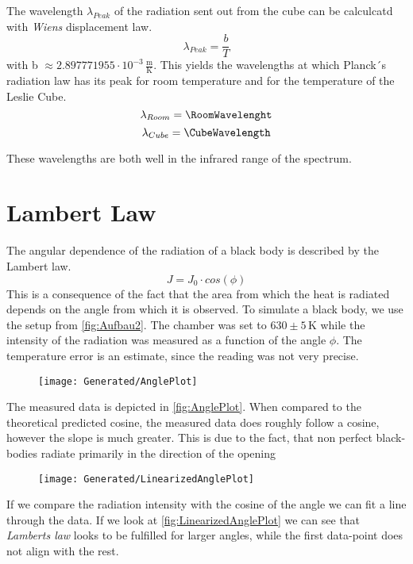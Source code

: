 \documentclass[a4paper,10pt,twocolumn]{article}
\begin{document}
    The wavelength $\lambda_{Peak}$ of the radiation sent out from the cube can be calculcatd with \textit{Wiens} displacement law.
    \begin{equation}
        \lambda_{Peak} = \frac{b}{T}
    \end{equation}
    with b $\approx 2.897771955\cdot 10^{-3}\,\frac{\text{m}}{\text{K}}$.
    This yields the wavelengths at which Planck´s radiation law has its peak for room temperature and for the temperature of the Leslie Cube.
    \begin{equation}
        \lambda_{Room} = \RoomWavelenght
    \end{equation}
    \begin{equation}
        \lambda_{Cube} = \CubeWavelength
    \end{equation}
    
    These wavelengths are both well in the infrared range of the spectrum.
    
    \section{Lambert Law}\label{sec:lambertLaw}
    The angular dependence of the radiation of a black body is described by the Lambert law.
    \begin{equation}
        J = J_0 \cdot cos(\phi)
    \end{equation}
    This is a consequence of the fact that the area from which the heat is radiated depends on the angle from which it is observed.
    To simulate a black body, we use the setup from \autoref{fig:Aufbau2}.
    The chamber was set to $630 \pm 5\,$K while the intensity of the radiation was measured as a function of the angle $\phi$.
    The temperature error is an estimate, since the reading was not very precise.
    \begin{figure}
        \begin{center}
            \texttt{[image: Generated/AnglePlot]}
            \caption{}
            \label{fig:AnglePlot}
        \end{center}
    \end{figure}
    The measured data is depicted in \autoref{fig:AnglePlot}.
    When compared to the theoretical predicted cosine, the measured data does roughly follow a cosine, however the slope is much greater.
    This is due to the fact, that non perfect black-bodies radiate primarily in the direction of the opening

    \begin{figure}
        \begin{center}
            \texttt{[image: Generated/LinearizedAnglePlot]}
            \caption{}
            \label{fig:LinearizedAnglePlot}
        \end{center}
    \end{figure}
    If we compare the radiation intensity with the cosine of the angle we can fit a line through the data.
    If we look at \autoref{fig:LinearizedAnglePlot} we can see that \textit{Lamberts law} looks to be fulfilled for larger angles,
    while the first data-point does not align with the rest.
\end{document}
